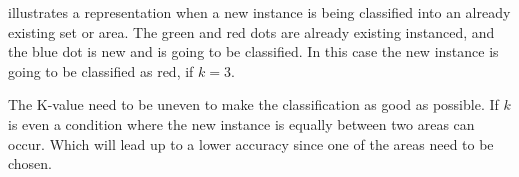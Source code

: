 \bigskip

 illustrates a representation when a new instance is being classified into an already existing set or area.
The green and red dots are already existing instanced, and the blue dot is new and is going to be classified.
In this case the new instance is going to be classified as red, if $k=3$.


\bigskip

The K-value need to be uneven to make the classification as good as possible. 
If $k$ is even a condition where the new instance is equally between two areas can occur.
Which will lead up to a lower accuracy since one of the areas need to be chosen.




